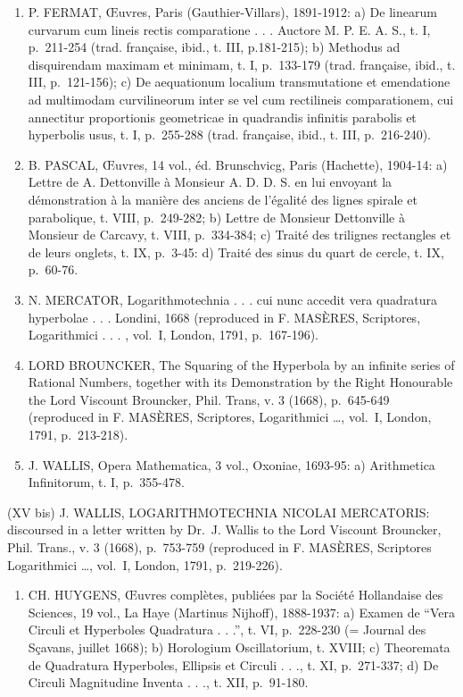 \begin{enumerate}
\def\labelenumi{(\Roman{enumi})}
\setcounter{enumi}{10}
\item
  P. FERMAT, Œuvres, Paris (Gauthier-Villars), 1891-1912: a) De linearum curvarum cum lineis rectis comparatione . . . Auctore M. P. E. A. S., t. I, p.~211-254 (trad. française, ibid., t. III, p.181-215); b) Methodus ad disquirendam maximam et minimam, t. I, p.~133-179 (trad. française, ibid., t. III, p.~121-156); c) De aequationum localium transmutatione et emendatione ad multimodam curvilineorum inter se vel cum rectilineis comparationem, cui annectitur proportionis geometricae in quadrandis infinitis parabolis et hyperbolis usus, t. I, p.~255-288 (trad. française, ibid., t. III, p.~216-240).
\item
  B. PASCAL, Œuvres, 14 vol., éd. Brunschvicg, Paris (Hachette), 1904-14: a) Lettre de A. Dettonville à Monsieur A. D. D. S. en lui envoyant la démonstration à la manière des anciens de l'égalité des lignes spirale et parabolique, t. VIII, p.~249-282; b) Lettre de Monsieur Dettonville à Monsieur de Carcavy, t. VIII, p.~334-384; c) Traité des trilignes rectangles et de leurs onglets, t. IX, p.~3-45: d) Traité des sinus du quart de cercle, t. IX, p.~60-76.
\item
  N. MERCATOR, Logarithmotechnia . . . cui nunc accedit vera quadratura hyperbolae . . . Londini, 1668 (reproduced in F. MASÈRES, Scriptores, Logarithmici . . . , vol.~I, London, 1791, p.~167-196).
\item
  LORD BROUNCKER, The Squaring of the Hyperbola by an infinite series of Rational Numbers, together with its Demonstration by the Right Honourable the Lord Viscount Brouncker, Phil. Trans, v. 3 (1668), p.~645-649 (reproduced in F. MASÈRES, Scriptores, Logarithmici \ldots, vol.~I, London, 1791, p.~213-218).
\item
  J. WALLIS, Opera Mathematica, 3 vol., Oxoniae, 1693-95: a) Arithmetica Infinitorum, t. I, p.~355-478.
\end{enumerate}

(XV bis) J. WALLIS, LOGARITHMOTECHNIA NICOLAI MERCATORIS: discoursed in a letter written by Dr.~J. Wallis to the Lord Viscount Brouncker, Phil. Trans., v. 3 (1668), p.~753-759 (reproduced in F. MASÈRES, Scriptores Logarithmici \ldots, vol.~I, London, 1791, p.~219-226).

\begin{enumerate}
\def\labelenumi{(\Roman{enumi})}
\setcounter{enumi}{15}
\tightlist
\item
  CH. HUYGENS, Œuvres complètes, publiées par la Société Hollandaise des Sciences, 19 vol., La Haye (Martinus Nijhoff), 1888-1937: a) Examen de ``Vera Circuli et Hyperboles Quadratura . . .'', t. VI, p.~228-230 (= Journal des Sçavans, juillet 1668); b) Horologium Oscillatorium, t. XVIII; c) Theoremata de Quadratura Hyperboles, Ellipsis et Circuli . . ., t. XI, p.~271-337; d) De Circuli Magnitudine Inventa . . ., t. XII, p.~91-180.
\end{enumerate}

